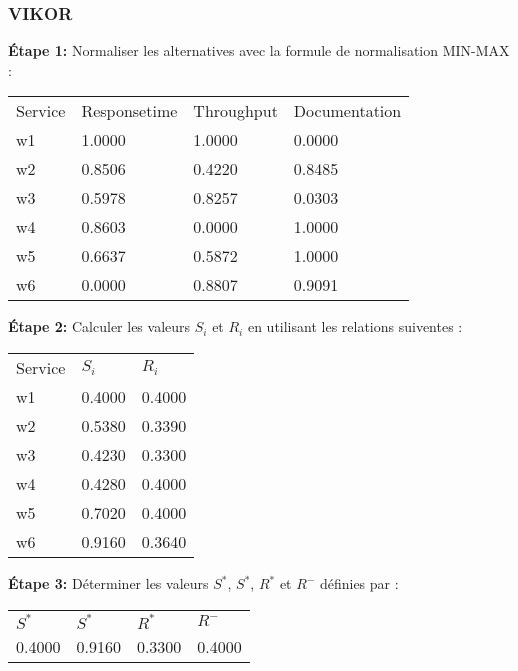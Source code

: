 \documentclass[french, 11pt, a4paper, oldfontcommands]{report}
\begin{document}
	\subsubsection{VIKOR}
	\textbf{Étape 1:} Normaliser les alternatives avec la formule de normalisation MIN-MAX : \\
	\begin{table}[ht]
		\begin{tabular}{llll}
	\rowcolor[HTML]{9B9B9B} 
	Service & Responsetime & Throughput & Documentation \\
	w1      & 1.0000       & 1.0000     & 0.0000        \\
	\rowcolor[HTML]{EFEFEF} 
	w2      & 0.8506       & 0.4220     & 0.8485        \\
	w3      & 0.5978       & 0.8257     & 0.0303        \\
	\rowcolor[HTML]{EFEFEF} 
	w4      & 0.8603       & 0.0000     & 1.0000        \\
	w5      & 0.6637       & 0.5872     & 1.0000        \\
	\rowcolor[HTML]{EFEFEF} 
	w6      & 0.0000       & 0.8807     & 0.9091       
		\end{tabular}
	\end{table}
	\par
	\textbf{Étape 2:} Calculer les valeurs $S_i$ et $R_i$ en utilisant les relations suiventes : \\
	\begin{table}[ht]
		\begin{tabular}{lll}
		\rowcolor[HTML]{9B9B9B} 
		Service & $S_i$  & $R_i$  \\
		w1      & 0.4000 & 0.4000 \\
		\rowcolor[HTML]{EFEFEF} 
		w2      & 0.5380 & 0.3390 \\
		w3      & 0.4230 & 0.3300 \\
		\rowcolor[HTML]{EFEFEF} 
		w4      & 0.4280 & 0.4000 \\
		w5      & 0.7020 & 0.4000 \\
		\rowcolor[HTML]{EFEFEF} 
		w6      & 0.9160 & 0.3640
		\end{tabular}
	\end{table}
    \par
	\textbf{Étape 3:} Déterminer les valeurs $S^*$, $S^*$, $R^*$ et $R^-$ définies par : \\
	\begin{table}[ht]
		\begin{tabular}{llll}
		\rowcolor[HTML]{9B9B9B} 
		$S^*$  & $S^*$  & $R^*$  & $R^-$  \\
		\rowcolor[HTML]{EFEFEF} 
		0.4000 & 0.9160 & 0.3300 & 0.4000
		\end{tabular}
	\end{table}
\end{document}
